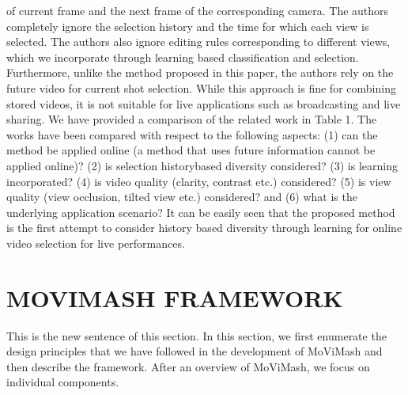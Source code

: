 \documentclass{sig-alternate}
\begin{document}
{{{of current frame and the next frame of the corresponding camera.
The authors completely ignore the selection history and the
time for which each view is selected. The authors also ignore editing
rules corresponding to different views, which we incorporate
through learning based classification and selection. Furthermore,
unlike the method proposed in this paper, the authors rely on the
future video for current shot selection. While this approach is fine
for combining stored videos, it is not suitable for live applications
such as broadcasting and live sharing.
We have provided a comparison of the related work in Table 1.
The works have been compared with respect to the following aspects:
(1) can the method be applied online (a method that uses future
information cannot be applied online)? (2) is selection historybased
diversity considered? (3) is learning incorporated? (4) is
video quality (clarity, contrast etc.) considered? (5) is view quality
(view occlusion, tilted view etc.) considered? and (6) what is the
underlying application scenario? It can be easily seen that the proposed
method is the first attempt to consider history based diversity
through learning for online video selection for live performances. 

\section{MOVIMASH FRAMEWORK}
This is the new sentence of this section.
In this section, we first enumerate the design principles that we
have followed in the development of MoViMash and then describe
the framework. After an overview of MoViMash, we focus on individual
components.

}}}
\end{document}
